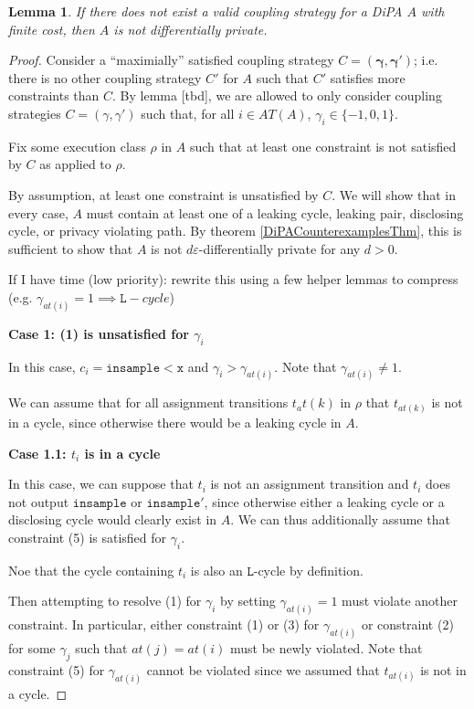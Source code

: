 \documentclass[12pt]{article}
\newcommand{\lguard}[1][x]{\texttt{insample} < #1}
\newcommand{\lcycle}{\texttt{L}-cycle}
\newtheorem{lemma}[thm]{Lemma}
\theoremstyle{definition}
\begin{document}
\begin{lemma}
    If there does not exist a valid coupling strategy for a DiPA $A$ with finite cost, then $A$ is not differentially private. 
\end{lemma}
\begin{proof}
    Consider a ``maximially'' satisfied coupling strategy $C=(\mathbf{\gamma}, \mathbf{\gamma}')$; i.e. there is no other coupling strategy $C'$ for $A$ such that $C'$ satisfies more constraints than $C$. By lemma [tbd], we are allowed to only consider coupling strategies $C=(\gamma, \gamma')$ such that, for all $i\in AT(A)$, $\gamma_i \in \{-1, 0, 1\}$. 

    Fix some execution class $\rho$ in $A$ such that at least one constraint is not satisfied by $C$ as applied to $\rho$.

    By assumption, at least one constraint is unsatisfied by $C$. We will show that in every case, $A$ must contain at least one of a leaking cycle, leaking pair, disclosing cycle, or privacy violating path. By theorem \ref{DiPACounterexamplesThm}, this is sufficient to show that $A$ is not $d\varepsilon$-differentially private for any $d>0$.

    {\color{red} If I have time (low priority): rewrite this using a few helper lemmas to compress (e.g. $\gamma_{at(i)} =1\implies \lcycle$)}

    \textbf{Case 1: (1) is unsatisfied for $\gamma_i$}
    
    In this case, $c_i = \lguard[\texttt{x}]$ and $\gamma_i > \gamma_{at(i)}$. Note that $\gamma_{at(i)} \neq 1$. 

    We can assume that for all assignment transitions $t_at(k)$ in $\rho$ that $t_{at(k)}$ is not in a cycle, since otherwise there would be a leaking cycle in $A$. 

    \textbf{Case 1.1: $t_i$ is in a cycle}

    In this case, we can suppose that $t_i$ is not an assignment transition and $t_i$ does not output $\texttt{insample}$ or $\texttt{insample}'$, since otherwise either a leaking cycle or a disclosing cycle would clearly exist in $A$. We can thus additionally assume that constraint (5) is satisfied for $\gamma_i$. 
    
    Noe that the cycle containing $t_i$ is also an $\texttt{L}$-cycle by definition.

    Then attempting to resolve (1) for $\gamma_i$ by setting $\gamma_{at(i)} = 1$ must violate another constraint. In particular, either constraint (1) or (3) for $\gamma_{at(i)}$ or constraint (2) for some $\gamma_j$ such that $at(j) = at(i)$ must be newly violated. Note that constraint (5) for $\gamma_{at(i)}$ cannot be violated since we assumed that $t_{at(i)}$ is not in a cycle. 


\end{proof}
\end{document}
